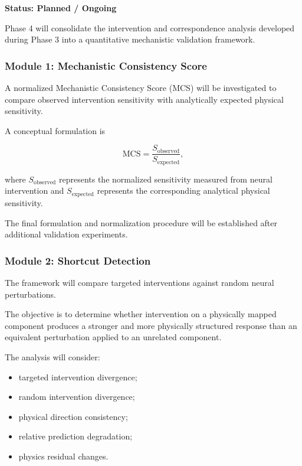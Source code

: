 \documentclass[12pt,singleside,a4paper]{article}
\begin{document}
\textbf{Status: Planned / Ongoing}

Phase 4 will consolidate the intervention and correspondence analysis
developed during Phase 3 into a quantitative mechanistic validation
framework.

\subsubsection{Module 1: Mechanistic Consistency Score}

A normalized Mechanistic Consistency Score (MCS) will be investigated
to compare observed intervention sensitivity with analytically expected
physical sensitivity.

A conceptual formulation is

\begin{equation}
    \mathrm{MCS}
    =
    \frac{
        S_{\mathrm{observed}}
    }{
        S_{\mathrm{expected}}
    },
\end{equation}

where $S_{\mathrm{observed}}$ represents the normalized sensitivity
measured from neural intervention and $S_{\mathrm{expected}}$
represents the corresponding analytical physical sensitivity.

The final formulation and normalization procedure will be established
after additional validation experiments.


\subsubsection{Module 2: Shortcut Detection}

The framework will compare targeted interventions against random
neural perturbations.

The objective is to determine whether intervention on a physically
mapped component produces a stronger and more physically structured
response than an equivalent perturbation applied to an unrelated
component.

The analysis will consider:

\begin{itemize}
    \item targeted intervention divergence;
    \item random intervention divergence;
    \item physical direction consistency;
    \item relative prediction degradation;
    \item physics residual changes.
\end{itemize}
\end{document}
